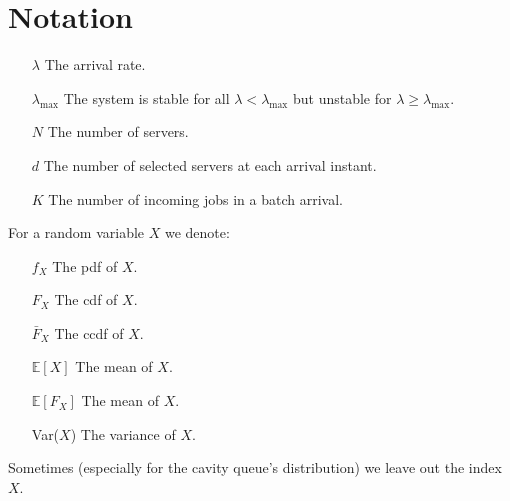 \documentclass[12pt]{report}
\newcommand{\E}{\mathbb{E}}
\begin{document}
\chapter*{Notation}
\begin{itemize}
\item[$\lambda$] The arrival rate.
\item[$\lambda_{\max}$] The system is stable for all $\lambda < \lambda_{\max}$ but unstable for $\lambda \geq \lambda_{\max}$.
\item[$N$] The number of servers.
\item[$d$] The number of selected servers at each arrival instant.
\item[$K$] The number of incoming jobs in a batch arrival.
\end{itemize}
For a random variable $X$ we denote:
\begin{itemize}
\item[$f_X$] The pdf of $X$.
\item[$F_X$] The cdf of $X$.
\item[$\bar F_X$] The ccdf of $X$.
\item[\textbf{$\E\left[X\right]$}] The mean of $X$.
\item[\textbf{$\E\left[F_X\right]$}] The mean of $X$.
\item[Var($X$)] The variance of $X$.
\end{itemize}
Sometimes (especially for the cavity queue's distribution) we leave out the index $X$.
\end{document}
